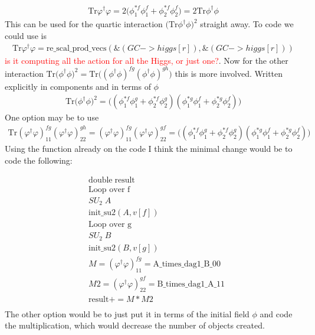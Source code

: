 \documentclass[]{scrartcl}
\newcommand{\note}[1]{\textcolor{red}{#1}}
\begin{document}
\begin{align}
	\text{Tr}\varphi^\dagger \varphi  = 2\Big(\phi_1^{*f}\phi_1^f + \phi_2^{*f}\phi_2^f\Big) = 2 \text{Tr}\phi^\dagger \phi
\end{align}
This can be used for the quartic interaction $\big(\text{Tr}\phi^\dagger \phi\big)^2$ straight away. To code we could use is
\begin{align}
	\text{Tr}\varphi^\dagger \varphi  = \text{re\_scal\_prod\_vecs}(\&(GC->higgs[r]), \&(GC->higgs[r]))
\end{align}
\note{is it computing all the action for all the Higgs, or just one?}. Now for the other interaction $\text{Tr}\big(\phi^\dagger \phi\big)^2=\text{Tr}\big((\phi^\dagger \phi)^{fg}(\phi^\dagger \phi)^{gh}\big)$ this is more involved. Written explicitly in components and in terms of $\phi$
\begin{align}
	\text{Tr}\big(\phi^\dagger \phi\big)^2=\Big((\phi^{*f}_{1}\phi^{g}_1+\phi^{*f}_2\phi^{g}_2)(\phi^{*g}_1\phi^{f}_1+\phi^{*g}_2\phi^{f}_2)\Big)
\end{align}
One option may be to use
\begin{align}
	\text{Tr}(\varphi^{\dagger}  \varphi)^{fg}_{11}(\varphi^{\dagger}  \varphi)^{gh}_{22}=(\varphi^{\dagger}  \varphi)^{fg}_{11}(\varphi^{\dagger}  \varphi)^{gf}_{22}=\Big((\phi^{*f}_{1}\phi^{g}_1+\phi^{*f}_2\phi^{g}_2)(\phi^{*g}_1\phi^{f}_1+\phi^{*g}_2\phi^{f}_2)\Big)
	\label{eq:quartic_varphi}
\end{align}
Using the function already on the code I think the minimal change would be to code the following:

\begin{align*}
	&\text{double} \; \text{result}\\
	&\text{Loop over f} \\
	&SU_2 \; A \\
	&\text{init\_}\text{su}2(A,v[f])\\
	&\text{Loop over g} \\
	&SU_2 \; B\\
	&\text{init\_}\text{su}2(B,v[g])\\
	&M=(\varphi^{\dagger}  \varphi)^{fg}_{11}=\text{A\_times\_dag1\_B\_}00\\
	&M2=(\varphi^{\dagger}  \varphi)^{gf}_{22}=\text{B\_times\_dag1\_A\_}11\\	
	&\text{result}+=M*M2\\
\end{align*}
The other option would be to just put it in terms of the initial field $\phi$ and code the multiplication, which would decrease the number of objects created.
\end{document}

